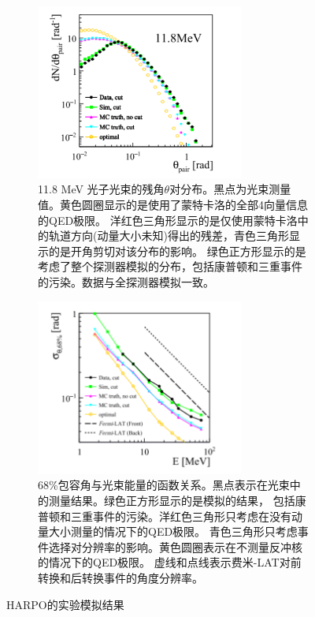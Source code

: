 \begin{figure}[htbp]
	\centering
	\begin{subfigure}[b]{0.45\textwidth}
		\includegraphics[width=0.75\textwidth]{figures/探测器模拟结果.png}
		\caption{11.8 MeV 光子光束的残角$\theta$对分布。黑点为光束测量值。黄色圆圈显示的是使用了蒙特卡洛的全部4向量信息的QED极限。
		洋红色三角形显示的是仅使用蒙特卡洛中的轨道方向(动量大小未知)得出的残差，青色三角形显示的是开角剪切对该分布的影响。
		绿色正方形显示的是考虑了整个探测器模拟的分布，包括康普顿和三重事件的污染。数据与全探测器模拟一致。}
		\label{fig:sub3}
	\end{subfigure}
	\hspace{0.01\textwidth} %
	\begin{subfigure}[b]{0.45\textwidth}
		\includegraphics[width=0.75\textwidth]{figures/角分辨率与能量关系.png}
		\caption{68\%包容角与光束能量的函数关系。黑点表示在光束中的测量结果。绿色正方形显示的是模拟的结果，
		包括康普顿和三重事件的污染。洋红色三角形只考虑在没有动量大小测量的情况下的QED极限。
		青色三角形只考虑事件选择对分辨率的影响。黄色圆圈表示在不测量反冲核的情况下的QED极限。
		虚线和点线表示费米-LAT对前转换和后转换事件的角度分辨率。}
		\label{fig:sub4}
	\end{subfigure}
	\caption{HARPO的实验模拟结果}
	\label{fig:figures2}
\end{figure}


